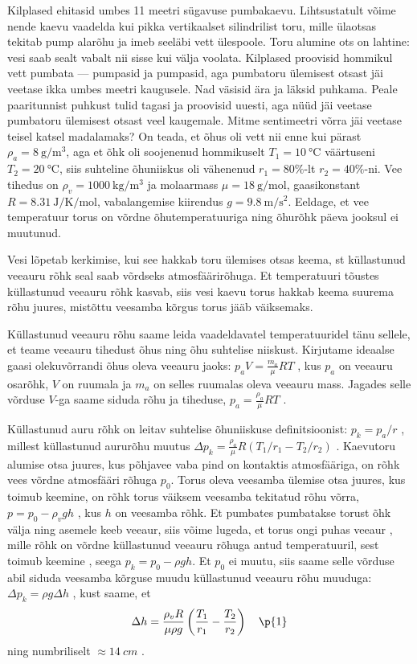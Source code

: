 
Kilplased ehitasid umbes 11 meetri sügavuse pumbakaevu. Lihtsustatult võime nende kaevu vaadelda kui pikka vertikaalset silindrilist toru, mille ülaotsas tekitab pump alarõhu ja imeb seeläbi vett ülespoole. Toru alumine ots on lahtine: vesi saab sealt vabalt nii sisse kui välja voolata. Kilplased proovisid hommikul vett pumbata --- pumpasid ja pumpasid, aga pumbatoru ülemisest otsast jäi veetase ikka umbes meetri kaugusele.  Nad väsisid ära ja läksid puhkama. Peale paaritunnist puhkust tulid tagasi ja proovisid uuesti, aga nüüd jäi  veetase pumbatoru ülemisest otsast veel kaugemale. Mitme sentimeetri võrra jäi veetase teisel katsel madalamaks? On teada, et õhus oli vett nii enne kui pärast $\rho_a=\SI{8}{\g\per\m\cubed}$, aga et õhk oli soojenenud hommikuselt $T_1=\SI{10}{\celsius}$ väärtuseni $T_2=\SI{20}{\celsius}$, siis suhteline õhuniiskus oli vähenenud $r_1=80\%$-lt $r_2=40\%$-ni. Vee tihedus on $\rho_v=\SI{1000}{\kg\per\m\cubed}$ ja molaarmass $\mu=\SI{18}{\g\per\mol}$, gaasikonstant $R=\SI{8.31}{\joule\per\kelvin\per\mol}$, vabalangemise kiirendus $g=\SI{9.8}{\m\per\s\squared}$. Eeldage, et vee temperatuur torus on võrdne õhutemperatuuriga ning õhurõhk päeva jooksul ei muutunud.


\hint

\solu
Vesi lõpetab kerkimise, kui see hakkab toru ülemises otsas keema, st küllastunud veeauru rõhk seal saab võrdseks atmosfäärirõhuga. Et temperatuuri tõustes küllastunud veeauru rõhk kasvab, siis vesi kaevu torus hakkab keema suurema rõhu juures, mistõttu veesamba kõrgus torus jääb väiksemaks.

Küllastunud veeauru rõhu saame leida vaadeldavatel temperatuuridel tänu sellele, et teame veeauru tihedust õhus ning õhu suhtelise niiskust. Kirjutame ideaalse gaasi olekuvõrrandi õhus oleva veeauru jaoks: $p_aV=\frac {m_a}\mu RT$ , kus $p_a$ on veeauru osarõhk, $V$ on ruumala ja $m_a$ on selles ruumalas oleva veeauru mass. Jagades selle võrduse $V$-ga saame siduda rõhu ja tiheduse, $p_a=\frac {\rho_a}\mu RT$ .

Küllastunud auru rõhk on leitav suhtelise õhuniiskuse definitsioonist: $p_k=p_a/r$ , millest küllastunud aururõhu muutus $\Delta p_k=\frac {\rho_a}\mu R(T_1/r_1-T_2/r_2)$ . Kaevutoru alumise otsa juures, kus põhjavee vaba pind on kontaktis atmosfääriga, on rõhk vees võrdne atmosfääri rõhuga $p_0$. Torus oleva veesamba ülemise otsa juures, kus toimub keemine, on rõhk torus väiksem veesamba tekitatud rõhu võrra, $p=p_0-\rho_v gh$ , kus $h$ on veesamba rõhk. Et pumbates pumbatakse torust õhk välja ning asemele keeb veeaur, siis võime lugeda, et torus ongi puhas veeaur , mille rõhk on võrdne küllastunud veeauru rõhuga antud temperatuuril, sest toimub keemine , seega $p_k=p_0-\rho gh$. Et $p_0$ ei muutu, siis saame selle võrduse abil siduda veesamba kõrguse muudu küllastunud veeauru rõhu muuduga: $\Delta p_k=\rho g\Delta h$ , kust saame, et
$$\Delta h=\frac {\rho_vR}{\mu\rho g}  \left(\frac{T_1}{r_1}-\frac{T_2}{r_2}\right)\quad\p{1}$$
ning numbriliselt $\approx \SI{14}{cm}$ .
\probend